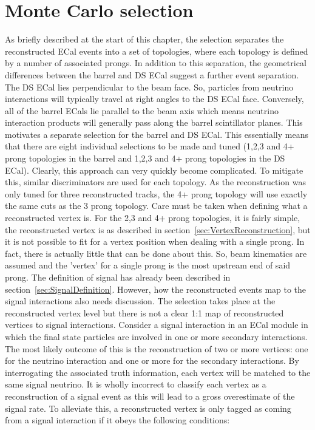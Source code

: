 
\section{Monte Carlo selection}
As briefly described at the start of this chapter, the selection separates the reconstructed ECal events into a set of topologies, where each topology is defined by a number of associated prongs.  In addition to this separation, the geometrical differences between the barrel and DS ECal suggest a further event separation.  The DS ECal lies perpendicular to the beam face.  So, particles from neutrino interactions will typically travel at right angles to the DS ECal face.  Conversely, all of the barrel ECals lie parallel to the beam axis which means neutrino interaction products will generally pass along the barrel scintillator planes.  This motivates a separate selection for the barrel and DS ECal.  This essentially means that there are eight individual selections to be made and tuned (1,2,3 and 4+ prong topologies in the barrel and 1,2,3 and 4+ prong topologies in the DS ECal).  Clearly, this approach can very quickly become complicated.  To mitigate this, similar discriminators are used for each topology.  As the reconstruction was only tuned for three reconstructed tracks, the 4+ prong topology will use exactly the same cuts as the 3 prong topology.
\newline
\newline
Care must be taken when defining what a reconstructed vertex is.  For the 2,3 and 4+ prong topologies, it is fairly simple, the reconstructed vertex is as described in section~\ref{sec:VertexReconstruction}, but it is not possible to fit for a vertex position when dealing with a single prong.  In fact, there is actually little that can be done about this.  So, beam kinematics are assumed and the 'vertex' for a single prong is the most upstream end of said prong.
\newline
\newline
The definition of signal has already been described in section~\ref{sec:SignalDefinition}.  However, how the reconstructed events map to the signal interactions also needs discussion.  The selection takes place at the reconstructed vertex level but there is not a clear 1:1 map of reconstructed vertices to signal interactions.  Consider a signal interaction in an ECal module in which the final state particles are involved in one or more secondary interactions.  The most likely outcome of this is the reconstruction of two or more vertices: one for the neutrino interaction and one or more for the secondary interactions.  By interrogating the associated truth information, each vertex will be matched to the same signal neutrino.  It is wholly incorrect to classify each vertex as a reconstruction of a signal event as this will lead to a gross overestimate of the signal rate.  To alleviate this,  a reconstructed vertex is only tagged as coming from a signal interaction if it obeys the following conditions:
